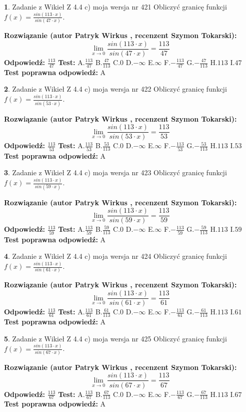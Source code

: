 \documentclass[12pt, a4paper]{article}
\theoremstyle{definition} %
\newtheorem{zad}{}
\newcommand{\zadStart}[1]{\begin{zad}#1\newline}
\newcommand{\zadStop}{\end{zad}}
\newcommand{\rozwStart}[2]{\noindent \textbf{Rozwiązanie (autor #1 , recenzent #2): }\newline}
\newcommand{\rozwStop}{\newline}
\newcommand{\odpStart}{\noindent \textbf{Odpowiedź:}\newline}
\newcommand{\odpStop}{\newline}
\newcommand{\testStart}{\noindent \textbf{Test:}\newline}
\newcommand{\testStop}{\newline}
\newcommand{\kluczStart}{\noindent \textbf{Test poprawna odpowiedź:}\newline}
\newcommand{\kluczStop}{\newline}
\begin{document}
\zadStart{Zadanie z Wikieł Z 4.4 c) moja wersja nr 421}
Obliczyć granicę funkcji $f(x)=\frac{sin(113\cdot x)}{sin(47\cdot x)}$.
\zadStop
\rozwStart{Patryk Wirkus}{Szymon Tokarski}
$$\lim\limits_{x\to 0}\frac{sin(113\cdot x)}{sin(47\cdot x)}=
\frac{113}{47}$$
\rozwStop
\odpStart
$\frac{113}{47}$
\odpStop
\testStart
A.$\frac{113}{47}$
B.$\frac{47}{113}$
C.$0$
D.$-\infty$
E.$\infty$
F.$-\frac{113}{47}$
G.$-\frac{47}{113}$
H.$113$
I.$47$
\testStop
\kluczStart
A
\kluczStop



\zadStart{Zadanie z Wikieł Z 4.4 c) moja wersja nr 422}
Obliczyć granicę funkcji $f(x)=\frac{sin(113\cdot x)}{sin(53\cdot x)}$.
\zadStop
\rozwStart{Patryk Wirkus}{Szymon Tokarski}
$$\lim\limits_{x\to 0}\frac{sin(113\cdot x)}{sin(53\cdot x)}=
\frac{113}{53}$$
\rozwStop
\odpStart
$\frac{113}{53}$
\odpStop
\testStart
A.$\frac{113}{53}$
B.$\frac{53}{113}$
C.$0$
D.$-\infty$
E.$\infty$
F.$-\frac{113}{53}$
G.$-\frac{53}{113}$
H.$113$
I.$53$
\testStop
\kluczStart
A
\kluczStop



\zadStart{Zadanie z Wikieł Z 4.4 c) moja wersja nr 423}
Obliczyć granicę funkcji $f(x)=\frac{sin(113\cdot x)}{sin(59\cdot x)}$.
\zadStop
\rozwStart{Patryk Wirkus}{Szymon Tokarski}
$$\lim\limits_{x\to 0}\frac{sin(113\cdot x)}{sin(59\cdot x)}=
\frac{113}{59}$$
\rozwStop
\odpStart
$\frac{113}{59}$
\odpStop
\testStart
A.$\frac{113}{59}$
B.$\frac{59}{113}$
C.$0$
D.$-\infty$
E.$\infty$
F.$-\frac{113}{59}$
G.$-\frac{59}{113}$
H.$113$
I.$59$
\testStop
\kluczStart
A
\kluczStop



\zadStart{Zadanie z Wikieł Z 4.4 c) moja wersja nr 424}
Obliczyć granicę funkcji $f(x)=\frac{sin(113\cdot x)}{sin(61\cdot x)}$.
\zadStop
\rozwStart{Patryk Wirkus}{Szymon Tokarski}
$$\lim\limits_{x\to 0}\frac{sin(113\cdot x)}{sin(61\cdot x)}=
\frac{113}{61}$$
\rozwStop
\odpStart
$\frac{113}{61}$
\odpStop
\testStart
A.$\frac{113}{61}$
B.$\frac{61}{113}$
C.$0$
D.$-\infty$
E.$\infty$
F.$-\frac{113}{61}$
G.$-\frac{61}{113}$
H.$113$
I.$61$
\testStop
\kluczStart
A
\kluczStop



\zadStart{Zadanie z Wikieł Z 4.4 c) moja wersja nr 425}
Obliczyć granicę funkcji $f(x)=\frac{sin(113\cdot x)}{sin(67\cdot x)}$.
\zadStop
\rozwStart{Patryk Wirkus}{Szymon Tokarski}
$$\lim\limits_{x\to 0}\frac{sin(113\cdot x)}{sin(67\cdot x)}=
\frac{113}{67}$$
\rozwStop
\odpStart
$\frac{113}{67}$
\odpStop
\testStart
A.$\frac{113}{67}$
B.$\frac{67}{113}$
C.$0$
D.$-\infty$
E.$\infty$
F.$-\frac{113}{67}$
G.$-\frac{67}{113}$
H.$113$
I.$67$
\testStop
\kluczStart
A
\kluczStop
\end{document}
